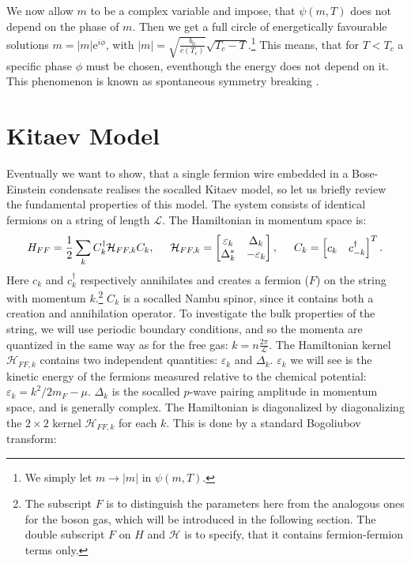 We now allow $m$ to be a complex variable and impose, that $\psi(m, T)$ does not depend on the phase of $m$. Then we get a full circle of energetically favourable solutions $m = |m| \text{e}^{i\phi}$, with $|m| = \sqrt{\frac{b_0}{c(T_c)}}\sqrt{T_c-T}$.\footnote{We simply let $m \to |m|$ in $\psi(m, T)$.} This means, that for $T < T_c$ a specific phase $\phi$ must be chosen, eventhough the energy does not depend on it. This phenomenon is known as spontaneous symmetry breaking \cite[pp. 72-74]{BruusFlensberg}. 

\section{Kitaev Model}
\label{sec.KitaevModel}
Eventually we want to show, that a single fermion wire embedded in a Bose-Einstein condensate realises the socalled Kitaev model, so let us briefly review the fundamental properties of this model. The system consists of identical fermions on a string of length $\mathcal{L}$. The Hamiltonian in momentum space is: 
\begin{equation}
H_{FF} = \frac{1}{2}\sum_{k} C^\dagger_k \mathcal{H}_{FF,k} C_k, \hspace{0.5cm} \mathcal{H}_{FF,k} = \begin{bmatrix} \varepsilon_k & \Delta_k \\ \Delta^*_k & -\varepsilon_k \end{bmatrix}, \hspace{0.5cm} C_k = \begin{bmatrix} c_k & c^\dagger_{-k} \end{bmatrix}^{T}. 
\label{eq.HKitaevpre}
\end{equation}
Here $c_k$ and $c_k^\dagger$ respectively annihilates and creates a fermion ($F$) on the string with momentum $k$.\footnote{The subscript $F$ is to distinguish the parameters here from the analogous ones for the boson gas, which will be introduced in the following section. The double subscript $F$ on $H$ and $\mathcal{H}$ is to specify, that it contains fermion-fermion terms only.} $C_k$ is a socalled Nambu spinor, since it contains both a creation and annihilation operator. To investigate the bulk properties of the string, we will use periodic boundary conditions, and so the momenta are quantized in the same way as for the free gas: $k = n\frac{2\pi}{\mathcal{L}}$. The Hamiltonian kernel $\mathcal{H}_{FF,k}$ contains two independent quantities: $\varepsilon_k$ and $\Delta_k$. $\varepsilon_k$ we will see is the kinetic energy of the fermions measured relative to the chemical potential: $\varepsilon_k = k^2/2m_F-\mu$. $\Delta_k$ is the socalled $p$-wave pairing amplitude in momentum space, and is generally complex. The Hamiltonian is diagonalized by diagonalizing the $2\times 2$ kernel $\mathcal{H}_{FF,k}$ for each $k$. This is done by a standard Bogoliubov transform: 
